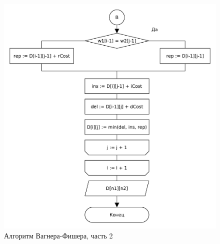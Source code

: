 \begin{figure}[H]
    \centering
    \includegraphics[scale=0.75]{pdf/wagner-fischer-part2.pdf}
    \caption{Алгоритм Вагнера-Фишера, часть 2}
\end{figure}

